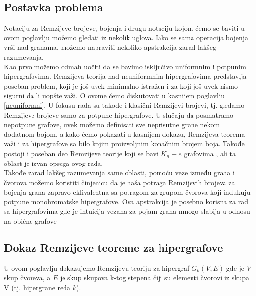 \documentclass[a4paper]{article}
\begin{document}
	\subsection{Postavka problema}\label{psotavka}
	Notaciju za Remzijeve brojeve, bojenja i drugu notaciju kojom ćemo se baviti u ovom poglavlju možemo gledati iz nekolik uglova. Iako se sama operacija bojenja vrši nad granama, možemo napraviti nekoliko apstrakcija zarad lakšeg razumevanja.\\
	Kao prvo možemo odmah uočiti da se bavimo isključivo uniformnim i potpunim hipergrafovima. Remzijeva teorija nad neuniformnim hipergrafovima predstavlja poseban problem, koji je još uvek minimalno istražen i za koji još uvek nismo sigurni da li uopšte važi. O ovome ćemo diskutovati u kasnijem poglavlju \ref{neuniformni}. U fokusu rada su takođe i klasični Remzijevi brojevi, tj. gledamo Remzijeve brojeve samo za potpune hipergrafove. U slučaju da posmatramo nepotpune grafove, uvek možemo definisati sve neprisutne grane nekom dodatnom bojom, a kako ćemo pokazati u kasnijem dokazu, Remzijeva teorema važi i za hipergrafove sa bilo kojim proizvoljnim konačnim brojem boja. Takođe postoji i poseban deo Remzijeve teorije koji se bavi $K_n - e$ grafovima \cite{pregled}, ali ta oblast je izvan opsega ovog rada.\\
	Takođe zarad lakšeg razumevanja same oblasti, pomoću veze između grana i čvorova možemo koristiti činjenicu da je naša potraga Remzijevih brojeva za bojenja grana zapravo eklivalentna sa potragom za grupom čvorova koji indukuju potpune monohromatske hipergrafove. Ova apstrakcija je posebno korisna za rad sa hipergrafovima gde je intuicija vezana za pojam grana mnogo slabija u odnosu na obične grafove
	\subsection{Dokaz Remzijeve teoreme za hipergrafove}
	U ovom poglavlju dokazujemo Remzijevu teoriju %
	za hipergraf $ G_{k}(V, E)$ gde je $V$ skup čvoreva, a $E$ je skup skupova k-tog stepena čiji su elementi čvorovi iz skupa V (tj. hipergrane reda $k$).
	
\end{document}
